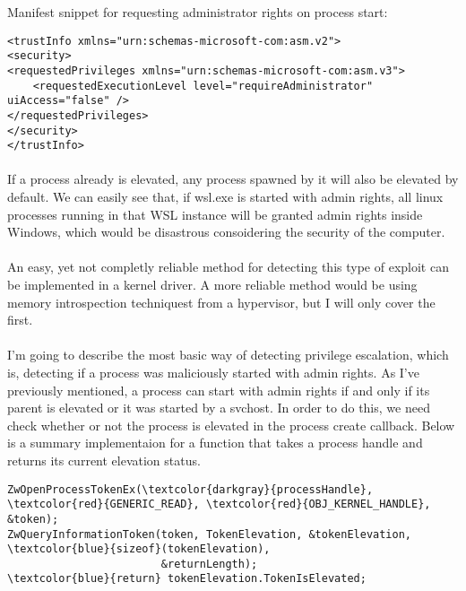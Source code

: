         Manifest snippet for requesting administrator rights on process start:
        \begin{verbatim}
<trustInfo xmlns="urn:schemas-microsoft-com:asm.v2">
<security>
<requestedPrivileges xmlns="urn:schemas-microsoft-com:asm.v3">
    <requestedExecutionLevel level="requireAdministrator" uiAccess="false" />
</requestedPrivileges>
</security>
</trustInfo>
        \end{verbatim}

        \paragraph{}
        If a process already is elevated, any process spawned by it will also be elevated by default. We can easily see that, if wsl.exe is started with admin rights, all linux
        processes running in that WSL instance will be granted admin rights inside Windows, which would be disastrous consoidering the security
        of the computer.

        \paragraph{}
        An easy, yet not completly reliable method for detecting this type of exploit can be implemented in a kernel driver. A more reliable method
        would be using memory introspection techniquest from a hypervisor, but I will only cover the first.

        \paragraph{}
        I'm going to describe the most basic way of detecting privilege escalation, which is, detecting if a process was maliciously started
        with admin rights. As I've previously mentioned, a process can start with admin rights if and only if its parent is elevated or it was started
        by a svchost. In order to do this, we need check whether or not the process is elevated in the process create callback. Below is a summary
        implementaion for a function that takes a process handle and returns its current elevation status.

        \begin{Verbatim}[fontsize=\small, commandchars=\\\{\}]
ZwOpenProcessTokenEx(\textcolor{darkgray}{processHandle}, \textcolor{red}{GENERIC_READ}, \textcolor{red}{OBJ_KERNEL_HANDLE}, &token);
ZwQueryInformationToken(token, TokenElevation, &tokenElevation, \textcolor{blue}{sizeof}(tokenElevation),
                        &returnLength);
\textcolor{blue}{return} tokenElevation.TokenIsElevated;
        \end{Verbatim}

